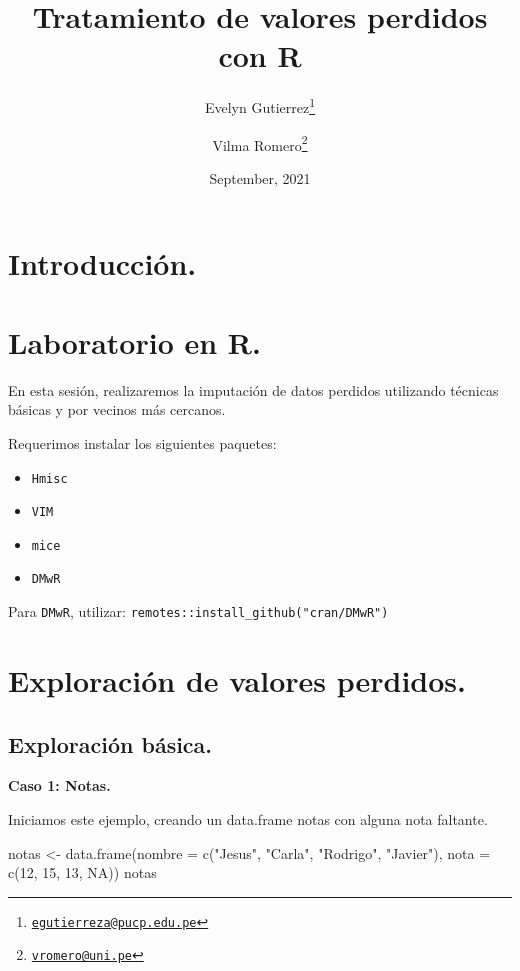 \documentclass[
]{article}
\title{Tratamiento de valores perdidos con R}
\author{Evelyn Gutierrez\footnote{\href{mailto:egutierreza@pucp.edu.pe}{\nolinkurl{egutierreza@pucp.edu.pe}}} \and Vilma
Romero\footnote{\href{mailto:vromero@uni.pe}{\nolinkurl{vromero@uni.pe}}}}
\date{September, 2021}
\newenvironment{Shaded}{\begin{snugshade}}{\end{snugshade}}
\newcommand{\AttributeTok}[1]{\textcolor[rgb]{0.77,0.63,0.00}{#1}}
\newcommand{\ConstantTok}[1]{\textcolor[rgb]{0.00,0.00,0.00}{#1}}
\newcommand{\DecValTok}[1]{\textcolor[rgb]{0.00,0.00,0.81}{#1}}
\newcommand{\FunctionTok}[1]{\textcolor[rgb]{0.00,0.00,0.00}{#1}}
\newcommand{\NormalTok}[1]{#1}
\newcommand{\OtherTok}[1]{\textcolor[rgb]{0.56,0.35,0.01}{#1}}
\newcommand{\StringTok}[1]{\textcolor[rgb]{0.31,0.60,0.02}{#1}}
\providecommand{\tightlist}{%
  \setlength{\itemsep}{0pt}\setlength{\parskip}{0pt}}
\begin{document}
\maketitle

{
\setcounter{tocdepth}{2}
\tableofcontents
}
\hypertarget{introducciuxf3n.}{%
\section{Introducción.}\label{introducciuxf3n.}}

\hypertarget{laboratorio-en-r.}{%
\section{Laboratorio en R.}\label{laboratorio-en-r.}}

En esta sesión, realizaremos la imputación de datos perdidos utilizando
técnicas básicas y por vecinos más cercanos.

Requerimos instalar los siguientes paquetes:

\begin{itemize}
\tightlist
\item
  \texttt{Hmisc}
\item
  \texttt{VIM}
\item
  \texttt{mice}
\item
  \texttt{DMwR}
\end{itemize}

Para \texttt{DMwR}, utilizar:
\texttt{remotes::install\_github("cran/DMwR")}

\hypertarget{exploraciuxf3n-de-valores-perdidos.}{%
\section{Exploración de valores
perdidos.}\label{exploraciuxf3n-de-valores-perdidos.}}

\hypertarget{exploraciuxf3n-buxe1sica.}{%
\subsection{Exploración básica.}\label{exploraciuxf3n-buxe1sica.}}

\textbf{Caso 1: Notas.}

Iniciamos este ejemplo, creando un data.frame notas con alguna nota
faltante.

\begin{Shaded}
\begin{Highlighting}[]
\NormalTok{notas }\OtherTok{\textless{}{-}} \FunctionTok{data.frame}\NormalTok{(}\AttributeTok{nombre =} \FunctionTok{c}\NormalTok{(}\StringTok{"Jesus"}\NormalTok{, }\StringTok{"Carla"}\NormalTok{, }\StringTok{"Rodrigo"}\NormalTok{, }\StringTok{"Javier"}\NormalTok{),}
                    \AttributeTok{nota =} \FunctionTok{c}\NormalTok{(}\DecValTok{12}\NormalTok{, }\DecValTok{15}\NormalTok{, }\DecValTok{13}\NormalTok{, }\ConstantTok{NA}\NormalTok{))}
\NormalTok{notas}
\end{Highlighting}
\end{Shaded}
\end{document}
